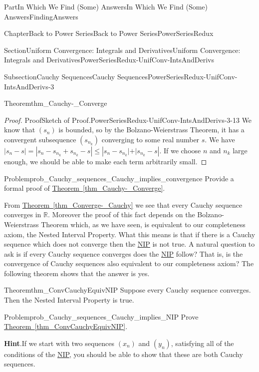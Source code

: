 \documentclass[oneside,10pt,]{book}
\newcommand{\blocktitlefont}{\relax}
\newcommand{\xreffont}{\relax}
\numberwithin{equation}{part}
\newcommand{\RR}{\mathbb {R}}
\begin{document}
\begin{partptx}{Part}{In Which We Find (Some) Answers}{}{In Which We Find (Some) Answers}{}{}{FindingAnswers}
\begin{chapterptx}{Chapter}{Back to Power Series}{}{Back to Power Series}{}{}{PowerSeriesRedux}
\begin{sectionptx}{Section}{Uniform Convergence: Integrals and Derivatives}{}{Uniform Convergence: Integrals and Derivatives}{}{}{PowerSeriesRedux-UnifConv-IntsAndDerivs}
\begin{subsectionptx}{Subsection}{Cauchy Sequences}{}{Cauchy Sequences}{}{}{PowerSeriesRedux-UnifConv-IntsAndDerivs-3}
\begin{theorem}{Theorem}{}{}{thm_Cauchy-_Converge}
\end{theorem}
\begin{proof}{Proof}{Sketch of Proof.}{PowerSeriesRedux-UnifConv-IntsAndDerivs-3-13}
We know that \(\left(s_n\right)\) \(\)is bounded, so by the Bolzano-Weierstrass Theorem, it has a convergent subsequence \(\left(s_{n_k}\right)\) converging to some real number \(s\).  We have \(|s_n-s|=|s_n-s_{n_k}+s_{n_k}-s|\leq|s_n-s_{n_k}\mathopen|+|s_{n_k}-s|\). If we choose \(n\) and \(n_k\) large enough, we should be able to make each term arbitrarily small.%
\end{proof}
\begin{problem}{Problem}{}{prob_Cauchy_sequences_Cauchy_implies_convergence}%
 Provide a formal proof of \hyperref[thm_Cauchy-_Converge]{Theorem~{\xreffont\ref{thm_Cauchy-_Converge}}}.%
\end{problem}
From \hyperref[thm_Converge-_Cauchy]{Theorem~{\xreffont\ref{thm_Converge-_Cauchy}}} we see that every Cauchy sequence converges in \(\RR\).  Moreover the proof of this fact depends on the Bolzano-Weierstrass Theorem which, as we have seen, is equivalent to our completeness axiom, the Nested Interval Property.  What this means is that if there is a Cauchy sequence which does not converge then the \hyperref[NIP]{NIP} is not true.  A natural question to ask is if every Cauchy sequence converges does the \hyperref[NIP]{NIP} follow? That is, is the convergence of Cauchy sequences also equivalent to our completeness axiom?  The following theorem shows that the answer is yes.%
\begin{theorem}{Theorem}{}{}{thm_ConvCauchyEquivNIP}%
 Suppose every Cauchy sequence converges.  Then the Nested Interval Property is true.%
\end{theorem}
\begin{problem}{Problem}{}{prob_Cauchy_sequences_Cauchy_implies_NIP}%
Prove \hyperref[thm_ConvCauchyEquivNIP]{Theorem~{\xreffont\ref{thm_ConvCauchyEquivNIP}}}.%
\par\smallskip%
\noindent\textbf{\blocktitlefont Hint}.\hypertarget{prob_Cauchy_sequences_Cauchy_implies_NIP-3}{}\quad{}If we start with two sequences \(\left(x_n\right)\) and \(\left(y_n\right)\), satisfying all of the conditions of the \hyperref[NIP]{NIP}, you should be able to show that these are both Cauchy sequences.%
\end{problem}

\end{subsectionptx}
\end{sectionptx}
\end{chapterptx}
\end{partptx}
\end{document}
